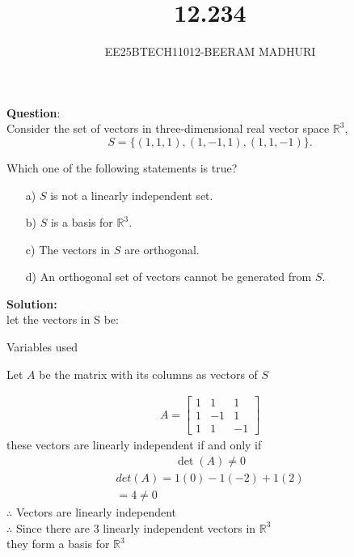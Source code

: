 \documentclass[journal]{IEEEtran}
\begin{document}

\vspace{3cm}

\title{12.234}
\author{EE25BTECH11012-BEERAM MADHURI}
{\let\newpage\relax\maketitle}

\renewcommand{\thefigure}{\theenumi}
\renewcommand{\thetable}{\theenumi}
\setlength{\intextsep}{10pt} %


\renewcommand{\thetable}{\theenumi}


\textbf{Question}:\\
Consider the set of vectors in three-dimensional real vector space $\mathbb{R}^3$,
\[S = \{(1, 1, 1), (1, -1, 1), (1, 1, -1)\}.\]

Which one of the following statements is true?

\begin{enumerate}
\item[a)] $S$ is not a linearly independent set.
\item[b)] $S$ is a basis for $\mathbb{R}^3$.
\item[c)] The vectors in $S$ are orthogonal.
\item[d)] An orthogonal set of vectors cannot be generated from $S$.
\end{enumerate}
\textbf{Solution:}\\
let the vectors in S be:
\begin{table}[H]
    \centering
    
    \caption{Variables used}
    \label{table 12.234}
\end{table}
Let $A$ be the matrix with its columns as vectors of $S$

\begin{align}
A = \begin{bmatrix}1 & 1 & 1 \\1 & -1 & 1 \\1 & 1 & -1\end{bmatrix}
\end{align}
these vectors are linearly independent if and only if
\begin{align}
\det(A) \neq 0
\end{align}
\begin{align}
    det(A)=1(0)-1(-2)+1(2)\\
    =4 \neq 0
\end{align}
$\therefore$ Vectors are linearly independent\\
$\therefore$ Since there are 3 linearly independent vectors in $\mathbb{R}^3$ \\they form a basis for $\mathbb{R}^3$
    
\end{document}
